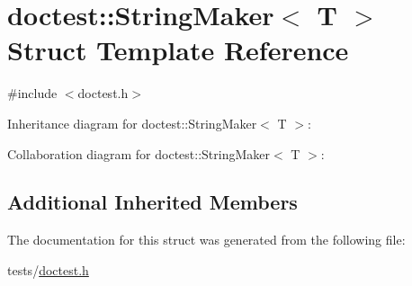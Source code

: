 \hypertarget{structdoctest_1_1StringMaker}{}\section{doctest\+:\+:String\+Maker$<$ T $>$ Struct Template Reference}
\label{structdoctest_1_1StringMaker}


{\ttfamily \#include $<$doctest.\+h$>$}



Inheritance diagram for doctest\+:\+:String\+Maker$<$ T $>$\+:


Collaboration diagram for doctest\+:\+:String\+Maker$<$ T $>$\+:
\subsection*{Additional Inherited Members}


The documentation for this struct was generated from the following file\+:\begin{DoxyCompactItemize}
\item 
tests/\hyperlink{doctest_8h}{doctest.\+h}\end{DoxyCompactItemize}
